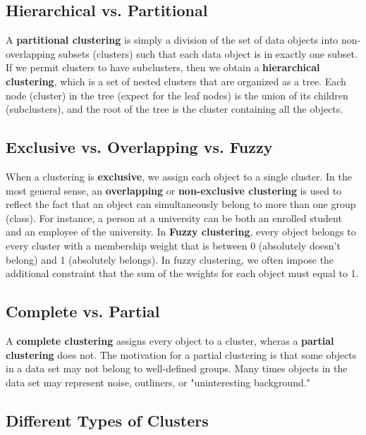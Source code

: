 		\subsection*{Hierarchical vs. Partitional} 
		A {\bf partitional clustering} is simply a division of the set of data objects into
		non-overlapping subsets (clusters) such that each data object is in exactly one subset.
		If we permit clusters to have subclusters, then we obtain a {\bf hierarchical clustering},
		which is a set of nested clusters that are organized as a tree. Each node (cluster)
		in the tree (expect for the leaf nodes) is the union of its children (subclusters),
		and the root of the tree is the cluster containing all the objects. 

		\subsection*{Exclusive vs. Overlapping vs. Fuzzy}
		When a clustering is {\bf exclusive}, we assign each object to a single cluster.
		In the most general sense, an {\bf overlapping} or {\bf non-exclusive clustering} 
		is used to reflect the fact that an object can simultaneously belong to more than
		one group (class). For instance, a person at a university can be both an enrolled
		student and an employee of the university. 
		In {\bf Fuzzy clustering}, every object belongs to every cluster with a membership
		weight that is between 0 (absolutely doesn't belong) and 1 (absolutely belongs).
		In fuzzy clustering, we often impose the additional constraint that the sum of the
		weights for each object must equal to 1.  

		\subsection*{Complete vs. Partial}
		A {\bf complete clustering} assigns every object to a cluster, wheras a {\bf partial clustering}
		does not. The motivation for a partial clustering is that some objects in a data 
		set may not belong to well-defined groups. Many times objects in the data set may
		represent noise, outliners, or "uninteresting background."

	\clearpage
	\subsection{Different Types of Clusters}

